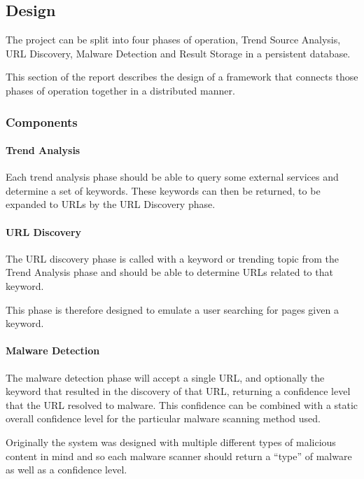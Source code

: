 \subsection{Design}
The project can be split into four phases of operation, Trend Source Analysis, URL Discovery, Malware Detection and Result Storage in a persistent database.

This section of the report describes the design of a framework that connects those phases of operation together in a distributed manner.

\subsubsection{Components}
\paragraph{Trend Analysis}
Each trend analysis phase should be able to query some external services and determine a set of keywords. These keywords can then be returned, to be expanded to URLs by the URL Discovery phase.

\paragraph{URL Discovery}
The URL discovery phase is called with a keyword or trending topic from the Trend Analysis phase and should be able to determine URLs related to that keyword.

This phase is therefore designed to emulate a user searching for pages given a keyword.



\paragraph{Malware Detection}
The malware detection phase will accept a single URL, and optionally the keyword that resulted in the discovery of that URL, returning a confidence level that the URL resolved to malware.  This confidence can be combined with a static overall confidence level for the particular malware scanning method used.

Originally the system was designed with multiple different types of malicious content in mind and so each malware scanner should return a ``type'' of malware as well as a confidence level. 

